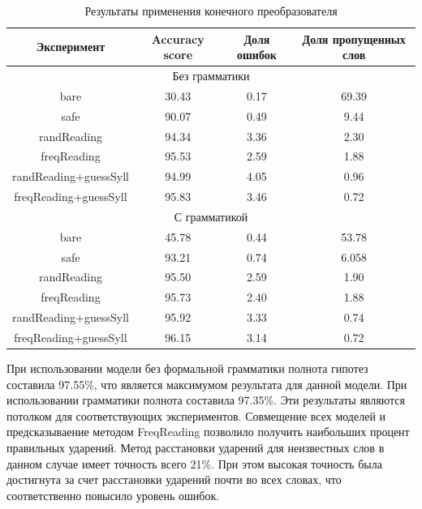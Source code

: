 \documentclass[14pt, a4paper, russian]{report}
\begin{document}
\begin{normalsize}
\begin{table}[H]
	\begin{small}
		\begin{center}
			\begin{tabular}{|c|c|c|c|}
				\hline
				Эксперимент & Accuracy score & Доля ошибок & Доля пропущенных слов\\
				\hline
				\multicolumn{4}{|c|}{Без грамматики} \\			
				\hline
				bare & 30.43 & 0.17 & 69.39 \\
				\hline
				safe & 90.07 & 0.49 & 9.44 \\
				\hline
				randReading &94.34 &3.36 &2.30 \\
				\hline
				freqReading &95.53 &2.59& 1.88 \\
				\hline
				randReading+guessSyll &94.99 &4.05 &0.96 \\
				\hline
				freqReading+guessSyll & 95.83 &3.46 &0.72\\
				\hline
				\multicolumn{4}{|c|}{С грамматикой} \\			
				\hline
				bare &45.78 & 0.44 &53.78\\
				\hline
				safe &93.21& 0.74 &6.058 \\
				\hline
				randReading &95.50 &2.59 &1.90 \\
				\hline
				freqReading &95.73 &2.40 &1.88 \\
				\hline
				randReading+guessSyll &95.92 &3.33 &0.74 \\
				\hline
				freqReading+guessSyll &96.15 &3.14 &0.72 \\
				\hline
				
			\end{tabular}
		\end{center}
	\end{small}
	\caption{Результаты применения конечного преобразователя}
	\label{table:final_state_result}
	
\end{table}

При использовании модели без формальной грамматики полнота гипотез составила 97.55\%, что является максимумом результата для данной модели. При использовании грамматики полнота составила 97.35\%. Эти результаты являются потолком для соответствующих экспериментов. Совмещение всех моделей и предсказываение методом FreqReading  позволило получить наибольших процент правильных ударений. Метод расстановки ударений для неизвестных слов в данном случае имеет точность всего 21\%. При этом высокая точность была достигнута за счет расстановки ударений почти во всех словах, что соответственно повысило уровень ошибок. 


\end{normalsize}
\end{document}
